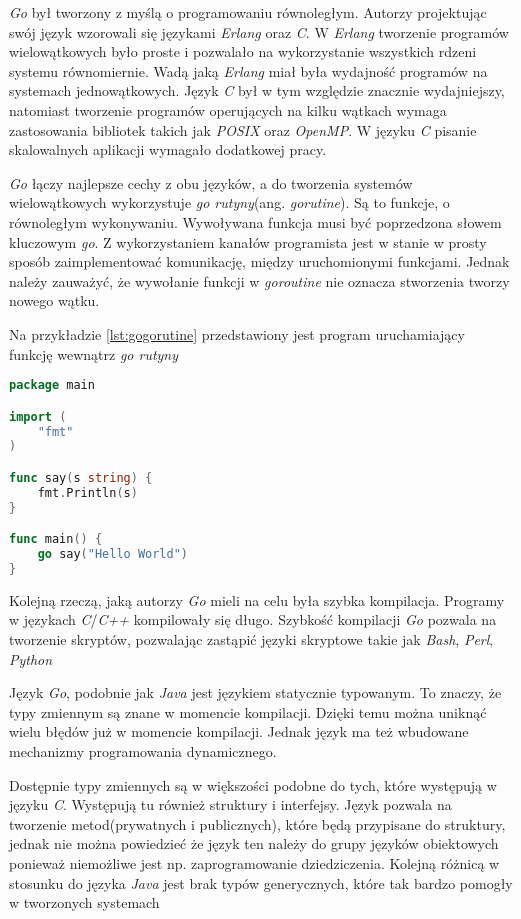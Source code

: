 \textsl{Go} był tworzony z myślą o programowaniu równoległym. Autorzy projektując swój język wzorowali się językami \textsl{Erlang} oraz \textsl{C}. W \textsl{Erlang} tworzenie programów wielowątkowych było proste i pozwalało na wykorzystanie wszystkich rdzeni systemu równomiernie. Wadą jaką \textsl{Erlang} miał była wydajność programów na systemach jednowątkowych. Język \textsl{C} był w tym względzie znacznie wydajniejszy, natomiast tworzenie programów operujących na kilku wątkach wymaga zastosowania bibliotek takich jak \textsl{POSIX} oraz \textsl{OpenMP}. W języku \textsl{C} pisanie skalowalnych aplikacji wymagało dodatkowej pracy.

\textsl{Go} łączy najlepsze cechy z obu języków, a do tworzenia systemów wielowątkowych wykorzystuje \textsl{go rutyny}(ang. \textsl{gorutine})\cite{gophrasebook}. Są to funkcje, o równoległym wykonywaniu. Wywoływana funkcja musi być poprzedzona słowem kluczowym \textsl{go}. Z wykorzystaniem kanałów programista jest w stanie w prosty sposób zaimplementować komunikację, między uruchomionymi funkcjami. Jednak należy zauważyć, że wywołanie funkcji w \textsl{goroutine} nie oznacza stworzenia tworzy nowego wątku. 

Na przykładzie \ref{lst:gogorutine} przedstawiony jest program uruchamiający funkcję wewnątrz \textsl{go rutyny}
\begin{lstlisting}[language=Go, caption={Przykładowy program w Go uruchamiający funkcję w oddzielnym wątku}, label={lst:gogorutine}]
package main

import (
	"fmt"
)

func say(s string) {
	fmt.Println(s)
}

func main() {
	go say("Hello World")
}
\end{lstlisting}



Kolejną rzeczą, jaką autorzy \textsl{Go} mieli na celu była szybka kompilacja. Programy w językach \textsl{C}/\textsl{C++} kompilowały się długo. Szybkość kompilacji \textsl{Go} pozwala na tworzenie skryptów, pozwalając zastąpić języki skryptowe takie jak \textsl{Bash}, \textsl{Perl}, \textsl{Python}

Język \textsl{Go}, podobnie jak \textsl{Java} jest językiem statycznie typowanym. To znaczy, że typy zmiennym są znane w momencie kompilacji. Dzięki temu można uniknąć wielu błędów już w momencie kompilacji. Jednak język ma też wbudowane mechanizmy programowania dynamicznego. 

Dostępnie typy zmiennych są w większości podobne do tych, które występują w języku \textsl{C}. Występują tu również struktury i interfejsy. Język pozwala na tworzenie metod(prywatnych i publicznych), które będą przypisane do struktury, jednak nie można powiedzieć że język ten należy do grupy języków obiektowych ponieważ niemożliwe jest np. zaprogramowanie dziedziczenia. Kolejną różnicą w stosunku do języka \textsl{Java} jest brak typów generycznych, które tak bardzo pomogły w tworzonych systemach
 
